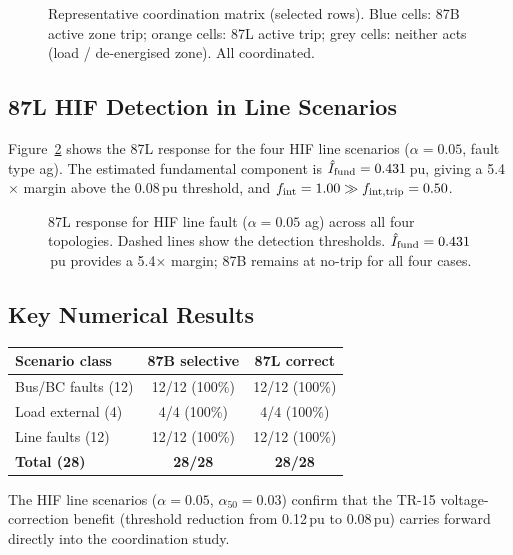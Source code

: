 \documentclass[11pt, a4paper]{article}
\begin{document}
\begin{figure}[h]
  \centering
  
  \caption{Representative coordination matrix (selected rows).  Blue cells:
           87B active zone trip; orange cells: 87L active trip; grey cells:
           neither acts (load / de-energised zone).  All coordinated.}
  \label{fig:matrix}
\end{figure}

\subsection{87L HIF Detection in Line Scenarios}

Figure~\ref{fig:hif} shows the 87L response for the four HIF line scenarios
($\alpha=0.05$, fault type ag).  The estimated fundamental component is
$\hat{I}_{\rm fund}=0.431$\,pu, giving a 5.4$\times$ margin above the
0.08\,pu threshold, and $f_{\rm int}=1.00 \gg f_{\rm int,trip}=0.50$.

\begin{figure}[h]
  \centering
  
  \caption{87L response for HIF line fault ($\alpha=0.05$ ag) across all
           four topologies.  Dashed lines show the detection thresholds.
           $\hat{I}_{\rm fund}=0.431$\,pu provides a 5.4$\times$ margin; 87B
           remains at no-trip for all four cases.}
  \label{fig:hif}
\end{figure}

\subsection{Key Numerical Results}

\begin{center}
\begin{tabular}{lcc}
  \toprule
  Scenario class & 87B selective & 87L correct \\
  \midrule
  Bus/BC faults (12)    & 12/12 (100\%) & 12/12 (100\%) \\
  Load external (4)     & 4/4   (100\%) & 4/4   (100\%) \\
  Line faults (12)      & 12/12 (100\%) & 12/12 (100\%) \\
  \midrule
  \textbf{Total (28)}   & \textbf{28/28} & \textbf{28/28} \\
  \bottomrule
\end{tabular}
\end{center}

The HIF line scenarios ($\alpha=0.05$, $\alpha_{50}=0.03$) confirm that the
TR-15 voltage-correction benefit (threshold reduction from 0.12\,pu to
0.08\,pu) carries forward directly into the coordination study.
\end{document}

